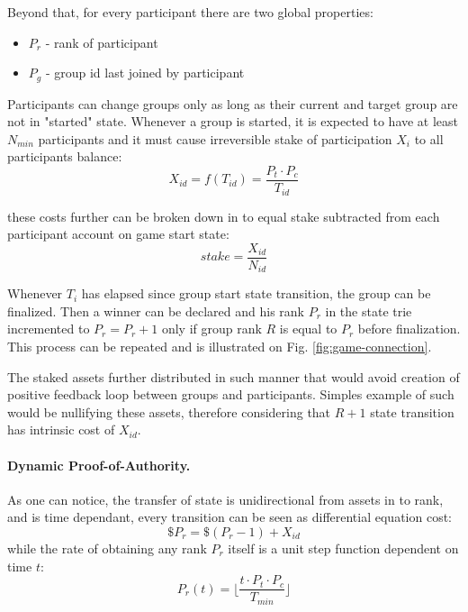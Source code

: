 \documentclass{article}
\begin{document}
\begin{CJK}{UTF8}{gbsn}
    Beyond that, for every participant there are two global properties:
    \begin{itemize}[nosep]
        \item  $P_r$ - rank of participant
        \item $P_g$ - group id last joined by participant
    \end{itemize}

    Participants can change groups only as long as their current and target group are not in "started" state. Whenever a group is started, it is expected to have at least $N_{min}$ participants and it must cause irreversible stake of participation $X_i$ to all participants balance:
    \begin{equation}
        \label{eq:group-fee}
        X_{id} = f(T_{id}) = \dfrac{P_t \cdot  P_c }{T_{id}}
    \end{equation}

    these costs further can be broken down in to equal stake subtracted from each participant account on game start state:
    \begin{equation}
        \label{eq:join-fee}
        stake = \dfrac{X_{id}}{ N_{id}}
    \end{equation}
    
    Whenever $T_{i}$ has elapsed since group start state transition, the group can be finalized. Then a winner can be declared and his rank $P_r$ in the state trie incremented to $P_r=P_r+1$ only if group rank $R$ is equal to $P_r$ before finalization. This process can be repeated and is illustrated on Fig. \ref*{fig:game-connection}.

    The staked assets further distributed in such manner that would avoid creation of positive feedback loop between groups and participants. Simples example of such would be nullifying these assets, therefore considering that $R+1$ state transition has intrinsic cost of $X_{id}$.


    \paragraph{Dynamic Proof-of-Authority.} As one can notice, the transfer of state is unidirectional from assets in to rank, and is time dependant, every transition can be seen as differential equation cost:
    \begin{equation}
        \label{eq:time-weighted-proof-of-authority}
        \$P_r = \$(P_r-1) + X_{id}
    \end{equation}
    while the rate of obtaining any rank $P_r$ itself is a unit step function dependent on time $t$:
    \begin{equation}
        \label{eq:time-weighted-proof-of-authority-1}
        P_r(t) = \lfloor \dfrac{t \cdot P_t \cdot P_c}{T_{min}} \rfloor
    \end{equation}


\end{CJK}
\end{document}

